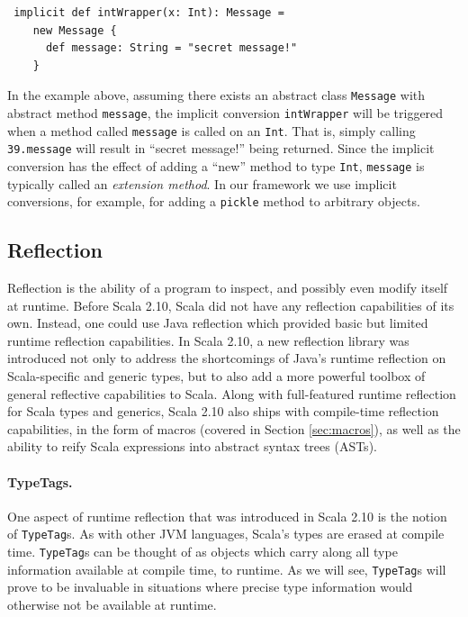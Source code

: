 \documentclass[preprint,10pt]{sigplanconf}
\theoremstyle{definition}
\theoremstyle{definition}
\newcommand{\term}[1]{\mbox{\texttt{#1}}}
\begin{document}
\begin{lstlisting}
 implicit def intWrapper(x: Int): Message =
    new Message {
      def message: String = "secret message!"
    }
\end{lstlisting}

In the example above, assuming there exists an abstract class \term{Message}
with abstract method \term{message}, the implicit conversion
\term{intWrapper} will be triggered when a method called \term{message}
is called on an \term{Int}. That is, simply calling
\term{39.message} will result in ``secret message!'' being
returned. Since the implicit conversion has the effect of adding a
``new'' method to type \term{Int}, \term{message} is typically called an
{\em extension method}. In our framework we use implicit conversions,
for example, for adding a \term{pickle} method to arbitrary objects.


\subsection{Reflection}
\label{sec:reflection}

Reflection is the ability of a program to inspect, and possibly even modify
itself at runtime. Before Scala 2.10, Scala did not have any reflection
capabilities of its own. Instead, one could use Java reflection which provided
basic but limited runtime reflection capabilities. In Scala 2.10, a new
reflection library was introduced not only to address the shortcomings of
Java's runtime reflection on Scala-specific and generic types, but to also add
a more powerful toolbox of general reflective capabilities to Scala. Along
with full-featured runtime reflection for Scala types and generics, Scala 2.10
also ships with compile-time reflection capabilities, in the form of macros
(covered in Section \ref{sec:macros}), as well as the ability to reify Scala
expressions into abstract syntax trees (ASTs).

\paragraph{TypeTags.} One aspect of runtime reflection that was introduced in
Scala 2.10 is the notion of \verb|TypeTag|s. As with other JVM languages,
Scala's types are erased at compile time. \verb|TypeTag|s can be thought of as
objects which carry along all type information available at compile time, to
runtime. As we will see, \verb|TypeTag|s will prove to be invaluable in
situations where precise type information would otherwise not be available at runtime.
\end{document}
